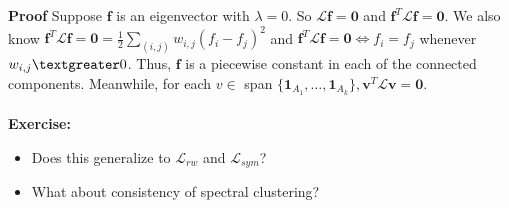 \documentclass[12pt]{article}
\theoremstyle{plain}
\begin{document}
\textbf{Proof}
Suppose $\mathbf{f}$ is an eigenvector with  $\lambda = 0$. So $\mathcal{L}\textbf{f} = \textbf{0}$ and $\textbf{f}^T\mathcal{L}\textbf{f} = \textbf{0}$. We also know $\textbf{f}^T\mathcal{L}\textbf{f} = \textbf{0} = \frac{1}{2} \sum_{(i,j)}w_{i,j}(f_i-f_j)^2$ and $\textbf{f}^T\mathcal{L}\textbf{f} = \textbf{0} \Leftrightarrow f_i=f_j$ whenever $w_{i,j} \textgreater 0$. 
Thus, $\textbf{f}$ is a piecewise constant in each of the connected components. Meanwhile, for each $v \in$ span $\{\mathbf{1}_{A_{1}}, \ldots, \mathbf{1}_{A_{k}} \}, \mathbf{v}^T \mathcal{L} \mathbf{v} = \mathbf{0}$. 
\\ \\ 
\textbf{Exercise:}
\begin{itemize}
	\item Does this generalize to $\mathcal{L}_{rw}$ and $\mathcal{L}_{sym}$?
	\item What about consistency of spectral clustering?
\end{itemize}
\end{document}
